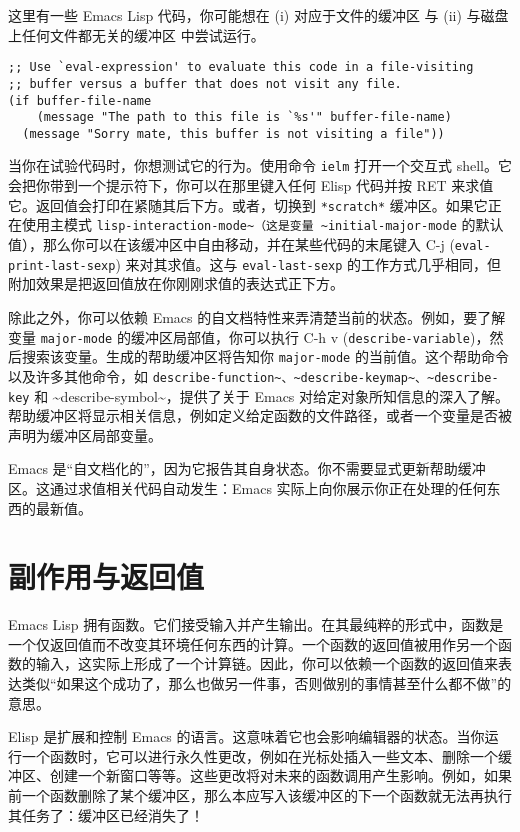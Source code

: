 \documentclass[11pt]{ctexart}
\begin{document}
这里有一些 Emacs Lisp 代码，你可能想在 (i) 对应于文件的缓冲区 与 (ii) 与磁盘上任何文件都无关的缓冲区 中尝试运行。

\begin{verbatim}
;; Use `eval-expression' to evaluate this code in a file-visiting
;; buffer versus a buffer that does not visit any file.
(if buffer-file-name
    (message "The path to this file is `%s'" buffer-file-name)
  (message "Sorry mate, this buffer is not visiting a file"))
\end{verbatim}

当你在试验代码时，你想测试它的行为。使用命令 \texttt{ielm} 打开一个交互式 shell。它会把你带到一个提示符下，你可以在那里键入任何 Elisp 代码并按 RET 来求值它。返回值会打印在紧随其后下方。或者，切换到 \texttt{*scratch*} 缓冲区。如果它正在使用主模式 \texttt{lisp-interaction-mode\textasciitilde{}（这是变量 \textasciitilde{}initial-major-mode} 的默认值），那么你可以在该缓冲区中自由移动，并在某些代码的末尾键入 C-j (\texttt{eval-print-last-sexp}) 来对其求值。这与 \texttt{eval-last-sexp} 的工作方式几乎相同，但附加效果是把返回值放在你刚刚求值的表达式正下方。

除此之外，你可以依赖 Emacs 的自文档特性来弄清楚当前的状态。例如，要了解变量 \texttt{major-mode} 的缓冲区局部值，你可以执行 C-h v (\texttt{describe-variable})，然后搜索该变量。生成的帮助缓冲区将告知你 \texttt{major-mode} 的当前值。这个帮助命令以及许多其他命令，如 \texttt{describe-function\textasciitilde{}、\textasciitilde{}describe-keymap\textasciitilde{}、\textasciitilde{}describe-key} 和 \textasciitilde{}describe-symbol\textasciitilde{}，提供了关于 Emacs 对给定对象所知信息的深入了解。帮助缓冲区将显示相关信息，例如定义给定函数的文件路径，或者一个变量是否被声明为缓冲区局部变量。

Emacs 是“自文档化的”，因为它报告其自身状态。你不需要显式更新帮助缓冲区。这通过求值相关代码自动发生：Emacs 实际上向你展示你正在处理的任何东西的最新值。
\section{副作用与返回值}
\label{sec:org7601617}
Emacs Lisp 拥有函数。它们接受输入并产生输出。在其最纯粹的形式中，函数是一个仅返回值而不改变其环境任何东西的计算。一个函数的返回值被用作另一个函数的输入，这实际上形成了一个计算链。因此，你可以依赖一个函数的返回值来表达类似“如果这个成功了，那么也做另一件事，否则做别的事情甚至什么都不做”的意思。

Elisp 是扩展和控制 Emacs 的语言。这意味着它也会影响编辑器的状态。当你运行一个函数时，它可以进行永久性更改，例如在光标处插入一些文本、删除一个缓冲区、创建一个新窗口等等。这些更改将对未来的函数调用产生影响。例如，如果前一个函数删除了某个缓冲区，那么本应写入该缓冲区的下一个函数就无法再执行其任务了：缓冲区已经消失了！
\end{document}
